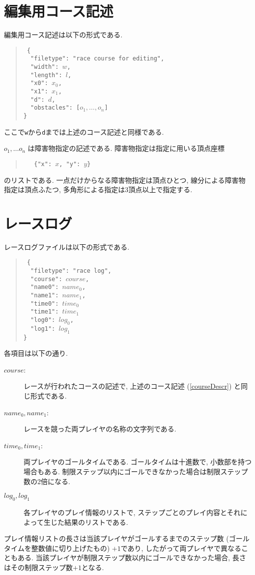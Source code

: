 \documentclass[11pt]{jarticle}
\begin{document}
\section{編集用コース記述}

編集用コース記述は以下の形式である.
\begin{quote}\tt
\{\\
~~"filetype": "race course for editing",\\
~~"width": $w$,\\
~~"length": $l$,\\
~~"x0": $x_0$,\\
~~"x1": $x_1$,\\
~~"d": $d$,\\
~~"obstacles": [$o_1, \ldots, o_n$]\\
\}
\end{quote}
ここで{\tt w}から{\tt d}までは上述のコース記述と同様である.

$o_1, \ldots o_n$ は障害物指定の記述である.
障害物指定は指定に用いる頂点座標
\begin{quote}\tt
~~\{"x": $x$, "y": $y$\}
\end{quote}
のリストである.
一点だけからなる障害物指定は頂点ひとつ, 線分による障害物指定は頂点ふたつ,
多角形による指定は3頂点以上で指定する.

\section{レースログ}

レースログファイルは以下の形式である.
\begin{quote}\tt
\{\\
~~"filetype": "race log",\\
~~"course": $course$,\\
~~"name0": $name_0$,\\
~~"name1": $name_1$,\\
~~"time0": $time_0$\\
~~"time1": $time_1$\\
~~"log0": $log_0$,\\
~~"log1": $log_1$\\
\}
\end{quote}
各項目は以下の通り.
\begin{description}
\item[$course$:]
  レースが行われたコースの記述で,
  上述のコース記述 (\ref{courseDescr}) と同じ形式である.
\item[$name_0, name_1$:]
  レースを競った両プレイヤの名称の文字列である.
\item[$time_0, time_1$:]
  両プレイヤのゴールタイムである.
  ゴールタイムは十進数で, 小数部を持つ場合もある.
  制限ステップ以内にゴールできなかった場合は制限ステップ数の2倍になる.
\item[$log_0, log_1$]
  各プレイヤのプレイ情報のリストで,
  ステップごとのプレイ内容とそれによって生じた結果のリストである.
\end{description}
プレイ情報リストの長さは当該プレイヤがゴールするまでのステップ数
(ゴールタイムを整数値に切り上げたもの) $+1$であり,
したがって両プレイヤで異なることもある.
当該プレイヤが制限ステップ数以内にゴールできなかった場合, 長さはその制限ステップ数$+1$となる.
\end{document}
